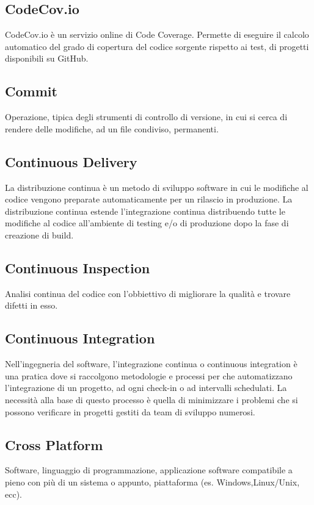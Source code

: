 \subsection{CodeCov.io}
CodeCov.io è un servizio online di Code Coverage. Permette di eseguire il calcolo automatico del grado di copertura del codice sorgente rispetto ai test, di progetti disponibili su GitHub.

\subsection{Commit}
Operazione, tipica degli strumenti di controllo di versione, in cui si cerca di rendere delle modifiche, ad un file condiviso, permanenti.

\subsection{Continuous Delivery}
La distribuzione continua è un metodo di sviluppo software in cui le modifiche al codice vengono preparate automaticamente per un rilascio in produzione. La distribuzione continua estende l'integrazione continua distribuendo tutte le modifiche al codice all'ambiente di testing e/o di produzione dopo la fase di creazione di build.

\subsection{Continuous Inspection}
Analisi continua del codice con l'obbiettivo di migliorare la qualità e trovare difetti in esso.

\subsection{Continuous Integration}
Nell'ingegneria del software, l'integrazione continua o continuous integration è una pratica dove si raccolgono metodologie e processi per che automatizzano l’integrazione di un progetto, ad ogni check-in o ad intervalli schedulati. La necessità alla base di questo processo è quella di minimizzare i problemi che si possono verificare in progetti gestiti da team di sviluppo numerosi.

\subsection{Cross Platform}
Software, linguaggio di programmazione, applicazione software compatibile a pieno con più di un sistema o appunto, piattaforma (es. Windows,Linux/Unix, ecc).

